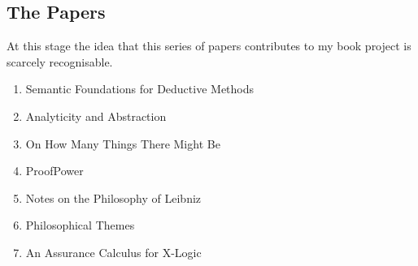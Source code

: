 \documentclass[numreferences]{rbjk}
\begin{document}
\begin{article}
\section{The Papers}

At this stage the idea that this series of papers contributes to my book project is scarcely recognisable.

\begin{enumerate}
\item Semantic Foundations for Deductive Methods \cite{rbjp001}
\item Analyticity and Abstraction \cite{rbjp002}
\item On How Many Things There Might Be \cite{rbjp003}
\item ProofPower \cite{rbjp004}
\item Notes on the Philosophy of Leibniz \cite{rbjp005}
\item Philosophical Themes \cite{rbjp006}
\item An Assurance Calculus for X-Logic \cite{rbjp007}
\end{enumerate}


%

{\raggedright


} %

\end{article}
\end{document}
